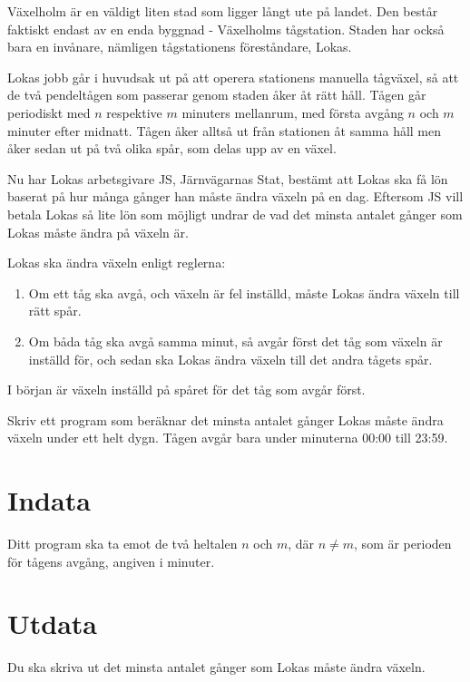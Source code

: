 
Växelholm är en väldigt liten stad som ligger långt ute på landet. Den består faktiskt endast av
en enda byggnad - Växelholms tågstation. Staden har också bara en invånare, nämligen tågstationens
föreståndare, Lokas. 

Lokas jobb går i huvudsak ut på att operera stationens manuella tågväxel, så att de två pendeltågen
som passerar genom staden åker åt rätt håll. Tågen går periodiskt med $n$ respektive $m$ minuters
mellanrum, med första avgång $n$ och $m$ minuter efter midnatt. Tågen åker alltså ut från stationen
åt samma håll men åker sedan ut på två olika spår, som delas upp av en växel.

Nu har Lokas arbetsgivare JS, Järnvägarnas Stat, bestämt att Lokas ska få lön baserat på hur många
gånger han måste ändra växeln på en dag. Eftersom JS vill betala Lokas så lite lön som möjligt undrar de
vad det minsta antalet gånger som Lokas måste ändra på växeln är.

Lokas ska ändra växeln enligt reglerna:
\begin{enumerate}
\item Om ett tåg ska avgå, och växeln är fel inställd, måste Lokas ändra växeln till rätt spår.
\item Om båda tåg ska avgå samma minut, så avgår först det tåg som växeln är inställd för, och sedan ska Lokas ändra växeln till det andra tågets spår.
\end{enumerate}

I början är växeln inställd på spåret för det tåg som avgår först. 

Skriv ett program som beräknar det minsta antalet gånger Lokas måste ändra växeln under ett helt dygn.
Tågen avgår bara under minuterna 00:00 till 23:59. 

\section*{Indata}
Ditt program ska ta emot de två heltalen $n$ och $m$, där $n \not= m$, som är perioden för tågens avgång, angiven i minuter.

\section*{Utdata}
Du ska skriva ut det minsta antalet gånger som Lokas måste ändra växeln.

